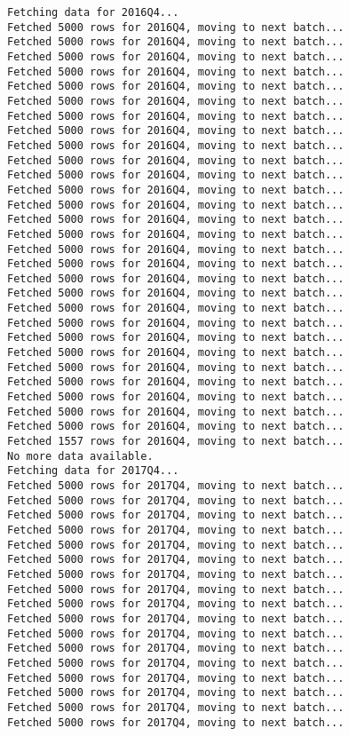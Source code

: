 \documentclass[
  letterpaper,
  DIV=11,
  numbers=noendperiod]{scrartcl}
\begin{document}
\begin{verbatim}
Fetching data for 2016Q4...
Fetched 5000 rows for 2016Q4, moving to next batch...
Fetched 5000 rows for 2016Q4, moving to next batch...
Fetched 5000 rows for 2016Q4, moving to next batch...
Fetched 5000 rows for 2016Q4, moving to next batch...
Fetched 5000 rows for 2016Q4, moving to next batch...
Fetched 5000 rows for 2016Q4, moving to next batch...
Fetched 5000 rows for 2016Q4, moving to next batch...
Fetched 5000 rows for 2016Q4, moving to next batch...
Fetched 5000 rows for 2016Q4, moving to next batch...
Fetched 5000 rows for 2016Q4, moving to next batch...
Fetched 5000 rows for 2016Q4, moving to next batch...
Fetched 5000 rows for 2016Q4, moving to next batch...
Fetched 5000 rows for 2016Q4, moving to next batch...
Fetched 5000 rows for 2016Q4, moving to next batch...
Fetched 5000 rows for 2016Q4, moving to next batch...
Fetched 5000 rows for 2016Q4, moving to next batch...
Fetched 5000 rows for 2016Q4, moving to next batch...
Fetched 5000 rows for 2016Q4, moving to next batch...
Fetched 5000 rows for 2016Q4, moving to next batch...
Fetched 5000 rows for 2016Q4, moving to next batch...
Fetched 5000 rows for 2016Q4, moving to next batch...
Fetched 5000 rows for 2016Q4, moving to next batch...
Fetched 5000 rows for 2016Q4, moving to next batch...
Fetched 5000 rows for 2016Q4, moving to next batch...
Fetched 5000 rows for 2016Q4, moving to next batch...
Fetched 5000 rows for 2016Q4, moving to next batch...
Fetched 5000 rows for 2016Q4, moving to next batch...
Fetched 5000 rows for 2016Q4, moving to next batch...
Fetched 1557 rows for 2016Q4, moving to next batch...
No more data available.
Fetching data for 2017Q4...
Fetched 5000 rows for 2017Q4, moving to next batch...
Fetched 5000 rows for 2017Q4, moving to next batch...
Fetched 5000 rows for 2017Q4, moving to next batch...
Fetched 5000 rows for 2017Q4, moving to next batch...
Fetched 5000 rows for 2017Q4, moving to next batch...
Fetched 5000 rows for 2017Q4, moving to next batch...
Fetched 5000 rows for 2017Q4, moving to next batch...
Fetched 5000 rows for 2017Q4, moving to next batch...
Fetched 5000 rows for 2017Q4, moving to next batch...
Fetched 5000 rows for 2017Q4, moving to next batch...
Fetched 5000 rows for 2017Q4, moving to next batch...
Fetched 5000 rows for 2017Q4, moving to next batch...
Fetched 5000 rows for 2017Q4, moving to next batch...
Fetched 5000 rows for 2017Q4, moving to next batch...
Fetched 5000 rows for 2017Q4, moving to next batch...
Fetched 5000 rows for 2017Q4, moving to next batch...
Fetched 5000 rows for 2017Q4, moving to next batch...

\end{verbatim}
\end{document}
